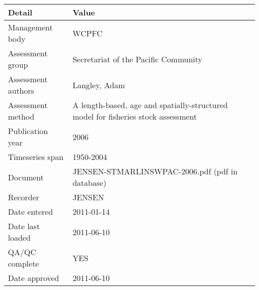 \begin{table}[htb]
\centering
\begin{tabular}{lp{7cm}}
\toprule
Detail & Value \\
\midrule
Management body    & WCPFC                                                                             \\
Assessment group   & Secretariat of the Pacific Community                                              \\
Assessment authors & Langley, Adam                                                                     \\
Assessment method  & A length-based, age and spatially-structured model for fisheries stock assessment \\
Publication year   & 2006                                                                              \\
Timeseries span    & 1950-2004                                                                         \\
Document           & JENSEN-STMARLINSWPAC-2006.pdf (pdf in database)                                   \\
Recorder           & JENSEN                                                                            \\
Date entered       & 2011-01-14                                                                        \\
Date last loaded   & 2011-06-10                                                                        \\
QA/QC complete     & YES                                                                               \\
Date approved      & 2011-06-10                                                                        \\
\bottomrule
\end{tabular}
\label{tab:assessdet}
\end{table}
